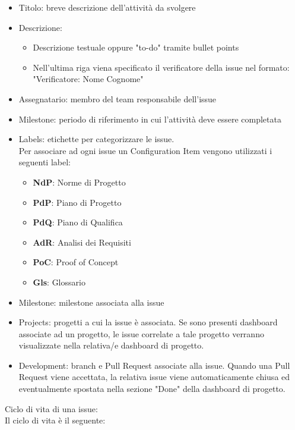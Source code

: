 \begin{itemize}
    \item Titolo: breve descrizione dell’attività da svolgere
    \item Descrizione:
        \begin{itemize}
            \item Descrizione testuale oppure "to-do" tramite bullet points
            \item Nell'ultima riga viena specificato il verificatore della issue nel formato: "Verificatore: Nome Cognome"
        \end{itemize}
    \item Assegnatario: membro del team responsabile dell'issue
    \item Milestone: periodo di riferimento in cui l’attività deve essere completata
    \item Labels: etichette per categorizzare le issue. \\Per associare ad ogni issue un Configuration Item vengono utilizzati i seguenti label:
        \begin{itemize}
            \item \textbf{NdP}: Norme di Progetto
            \item \textbf{PdP}: Piano di Progetto
            \item \textbf{PdQ}: Piano di Qualifica
            \item \textbf{AdR}: Analisi dei Requisiti
            \item \textbf{PoC}: Proof of Concept
            \item \textbf{Gls}: Glossario
        \end{itemize}
    \item Milestone: milestone associata alla issue
    \item Projects: progetti a cui la issue è associata. Se sono presenti dashboard associate ad un progetto, le issue correlate a tale progetto verranno visualizzate nella relativa/e dashboard di progetto.
    \item Development: branch e Pull Request associate alla issue. Quando una Pull Request viene accettata, la relativa issue viene automaticamente chiusa ed eventualmente spostata nella sezione "Done" della dashboard di progetto.
\end{itemize}
Ciclo di vita di una issue:\\
Il ciclo di vita è il seguente:
